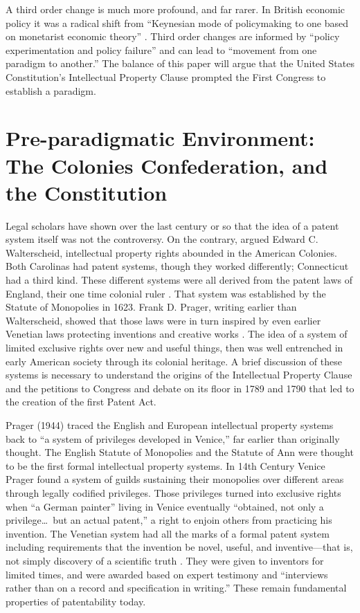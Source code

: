 \documentclass[pdftex,11pt,letterpaper]{article}
\begin{document}
A third order change is much more profound, and far rarer. In British economic policy it was a radical shift from ``Keynesian mode of policymaking to one based on monetarist economic theory'' \autocite{Hall1993}. Third order changes are informed by ``policy experimentation and policy failure'' and can lead to ``movement from one paradigm to another.'' The balance of this paper will argue that the United States Constitution's Intellectual Property Clause prompted the First Congress to establish a paradigm.


\section{Pre-paradigmatic Environment: The Colonies Confederation, and the Constitution}

Legal scholars have shown over the last century or so that the idea of a patent system itself was not the controversy. On the contrary, argued Edward C. Walterscheid, intellectual property rights abounded in the American Colonies. Both Carolinas had patent systems, though they worked differently; Connecticut had a third kind. These different systems were all derived from the patent laws of England, their one time colonial ruler \autocite{Walterscheid1997}. That system was established by the Statute of Monopolies in 1623. Frank D. Prager, writing earlier than Walterscheid, showed that those laws were in turn inspired by even earlier Venetian laws protecting inventions and creative works \autocite{Prager1944}. The idea of a system of limited exclusive rights over new and useful things, then was well entrenched in early American society through its colonial heritage. A brief discussion of these systems is necessary to understand the origins of the Intellectual Property Clause and the petitions to Congress and debate on its floor in 1789 and 1790 that led to the creation of the first Patent Act.

Prager (1944) traced the English and European intellectual property systems back to ``a system of privileges developed in Venice,'' far earlier than originally thought. The English Statute of Monopolies and the Statute of Ann were thought to be the first formal intellectual property systems. In 14th Century Venice Prager found a system of guilds sustaining their monopolies over different areas through legally codified privileges. Those privileges turned into exclusive rights when ``a German painter'' living in Venice eventually ``obtained, not only a privilege\ldots~but an actual patent,'' a right to enjoin others from practicing his invention. The Venetian system had all the marks of a formal patent system including requirements that the invention be novel, useful, and inventive---that is, not simply discovery of a scientific truth \autocite{Prager1944}. They were given to inventors for limited times, and were awarded based on expert testimony and ``interviews rather than on a record and specification in writing.'' These remain fundamental properties of patentability today.
\end{document}
